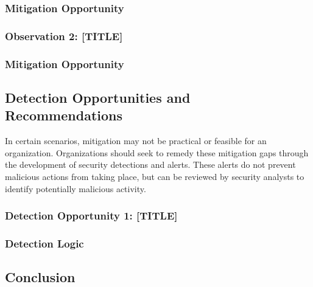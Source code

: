 \documentclass[
]{article}
\begin{document}
\lipsum[1][1-3]

\subsubsection{Mitigation Opportunity}\label{mitigation-opportunity}

\lipsum[1][3-5]

\subsubsection{Observation 2: [TITLE]}\label{observation-2}

\lipsum[2][1-3]

\subsubsection{Mitigation Opportunity}\label{mitigation-opportunity-1}

\lipsum[2][3-10]

\subsection{Detection Opportunities and
Recommendations}\label{detection-opportunities-and-recommendations}

In certain scenarios, mitigation may not be practical or feasible for an
organization. Organizations should seek to remedy these mitigation gaps
through the development of security detections and alerts. These alerts
do not prevent malicious actions from taking place, but can be reviewed
by security analysts to identify potentially malicious activity.

\subsubsection{Detection Opportunity 1: [TITLE]}\label{detection-opportunity-1}

\lipsum[1][1-5]

\subsubsection{Detection Logic}\label{detection-logic}

\lipsum[1][5-12]
\pagebreak

\subsection{Conclusion}\label{conclusion}
\end{document}

